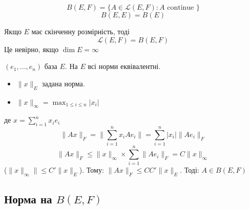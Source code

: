 \begin{notation}
   \[
       B(E, F) = \{ A \in \mathcal{L}(E, F): A \text{ continue } \}
   \]  
   \[
   B(E, E) = B(E)
   \] 
\end{notation}
\begin{lemma}
   Якщо $E$ має скінченну розмірність, тоді
   \[
       \mathcal{L}(E, F) = B(E, F)
   \] 
   Це невірно, якщо $\dim E = \infty$
\end{lemma}
\begin{preuve}
    $(e_1, \ldots, e_n)$ база $E$. На  $E$ всі норми еквівалентні.  
    \begin{itemize}
        \item $\|x\|_E$ задана норма.        
        \item $\|x\|_{\infty} = \max_{1 \le i \le n} |x_i|$ 
    \end{itemize}
    де $x = \sum_{i=1}^{n} x_ie_i$ 
    \[
    \|Ax\|_F = \|\sum_{i=1}^{n} x_iAe_i\| = \sum_{i=1}^{n} |x_i|\|Ae_i\|_F
    \] 
    \[
    \|Ax\|_F \le \|x\|_{\infty} \times \sum_{i=1}^{n} \|Ae_i\|_F = C\|x\|_{\infty}
    \] 
    ($\|x\|_{\infty}\| \le C'\|x\|_{E}$). Тому: $\|Ax\|_{F} \le CC'\|x\|_E$. Тоді: $A \in B(E, F)$
\end{preuve}

\subsection{Норма на $B(E, F)$}

